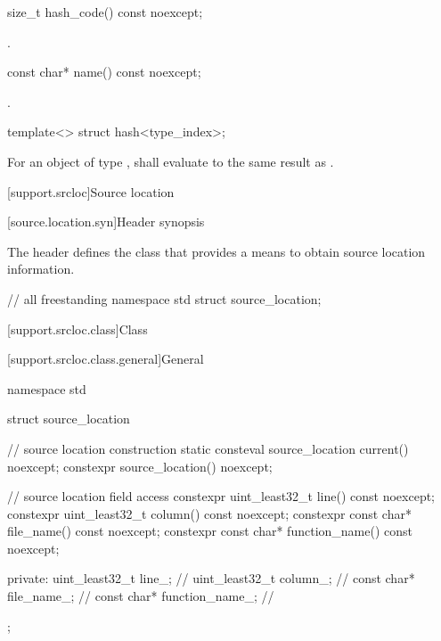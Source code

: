 %
\begin{itemdecl}
size_t hash_code() const noexcept;
\end{itemdecl}

\begin{itemdescr}
\pnum
\returns
{}.
\end{itemdescr}

%
\begin{itemdecl}
const char* name() const noexcept;
\end{itemdecl}

\begin{itemdescr}
\pnum
\returns
{}.
\end{itemdescr}

%
\begin{itemdecl}
template<> struct hash<type_index>;
\end{itemdecl}

\begin{itemdescr}
\pnum
For an object  of type ,
 shall evaluate to the same result as .
\end{itemdescr}

[support.srcloc]{Source location}

[source.location.syn]{Header  synopsis}

\pnum
The header  defines
the class 
that provides a means to obtain source location information.

\begin{codeblock}
// all freestanding
namespace std {
  struct source_location;
}
\end{codeblock}

[support.srcloc.class]{Class }

[support.srcloc.class.general]{General}

%
\begin{codeblock}
namespace std {
  struct source_location {
    // source location construction
    static consteval source_location current() noexcept;
    constexpr source_location() noexcept;

    // source location field access
    constexpr uint_least32_t line() const noexcept;
    constexpr uint_least32_t column() const noexcept;
    constexpr const char* file_name() const noexcept;
    constexpr const char* function_name() const noexcept;

  private:
    uint_least32_t line_;               // \expos
    uint_least32_t column_;             // \expos
    const char* file_name_;             // \expos
    const char* function_name_;         // \expos
  };
}
\end{codeblock}

